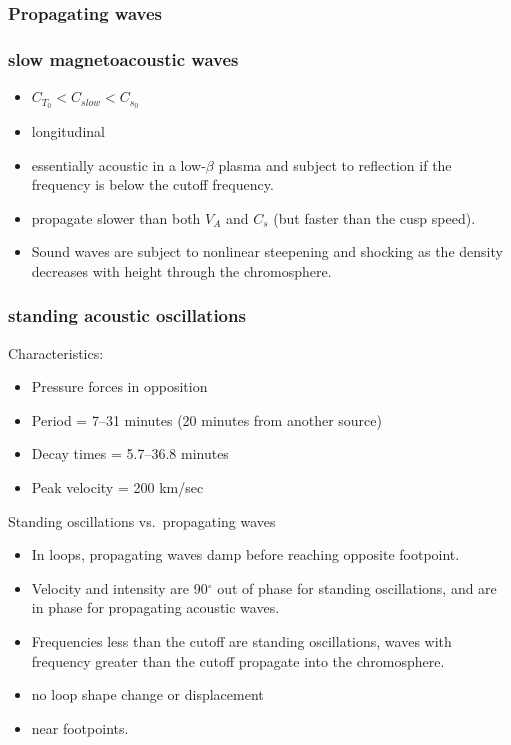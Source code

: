 \documentclass{article}
\begin{document}
\subsubsection{Propagating waves}

\subsubsection{slow magnetoacoustic waves}
\begin{itemize}
    \item $C_{T_{0}} < C_{slow} < C_{s_{0}}$
    \item longitudinal
    \item essentially acoustic in a low-$\beta$ plasma and subject to
        reflection if the frequency is below the cutoff frequency.
    \item propagate slower than both $V_{A}$ and $C_{s}$ (but faster than
        the cusp speed).
    \item Sound waves are subject to nonlinear steepening and shocking
        as the density decreases with height through the chromosphere.
\end{itemize}

\subsubsection{standing acoustic oscillations}
Characteristics:
\begin{itemize}
    \item Pressure forces in opposition
    \item Period = 7--31 minutes (20 minutes from another source)
    \item Decay times = 5.7--36.8 minutes
    \item Peak velocity = 200 km/sec
\end{itemize}
Standing oscillations vs.\ propagating waves
\begin{itemize}
    \item In loops, propagating waves damp before
        reaching opposite footpoint.
    \item Velocity and intensity are 90$^{\circ}$ out of phase
        for standing oscillations, and are in phase for propagating
        acoustic waves.
    \item Frequencies less than the cutoff are standing oscillations,
        waves with frequency greater than the cutoff propagate into
        the chromosphere.
    \item no loop shape change or displacement
    \item near footpoints.
\end{itemize}
\end{document}
